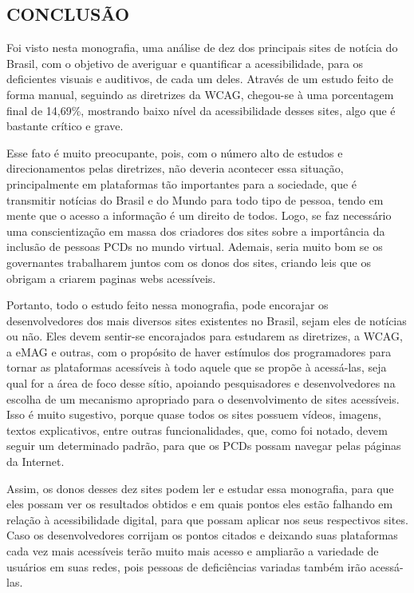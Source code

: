 \documentclass[a4paper]{article}
\begin{document}
\begin{titlepage}
\section{CONCLUSÃO}

Foi visto nesta monografia, uma análise de dez dos principais sites de notícia do Brasil, com o objetivo de averiguar e quantificar a acessibilidade, para os deficientes visuais e auditivos, de cada um deles. Através de um estudo feito de forma manual, seguindo as diretrizes da WCAG, chegou-se à uma porcentagem final de 14,69\%, mostrando baixo nível da acessibilidade desses sites, algo que é bastante crítico e grave. 

Esse fato é muito preocupante, pois, com o número alto de estudos e direcionamentos pelas diretrizes, não deveria acontecer essa situação, principalmente em plataformas tão importantes para a sociedade, que é transmitir notícias do Brasil e do Mundo para todo tipo de pessoa, tendo em mente que o acesso a informação é um direito de todos. Logo, se faz necessário uma conscientização em massa dos criadores dos sites sobre a importância da inclusão de pessoas PCDs no mundo virtual. Ademais, seria muito bom se os governantes trabalharem juntos com os donos dos sites, criando leis que os obrigam a criarem paginas webs acessíveis.

Portanto, todo o estudo feito nessa monografia, pode encorajar os desenvolvedores dos mais diversos sites existentes no Brasil, sejam eles de notícias ou não. Eles devem sentir-se encorajados para estudarem as diretrizes, a WCAG, a eMAG e outras, com o propósito de haver estímulos dos programadores para tornar as plataformas acessíveis à todo aquele que se propõe à acessá-las, seja qual for a área de foco desse sítio, apoiando pesquisadores e desenvolvedores na escolha de um mecanismo apropriado para o desenvolvimento de sites acessíveis. Isso é muito sugestivo, porque quase todos os sites possuem vídeos, imagens, textos explicativos, entre outras funcionalidades, que, como foi notado, devem seguir um determinado padrão, para que os PCDs possam navegar pelas páginas da Internet.

Assim, os donos desses dez sites podem ler e estudar essa monografia, para que eles possam ver os resultados obtidos e em quais pontos eles estão falhando em relação à acessibilidade digital, para que possam aplicar nos seus respectivos sites. Caso os desenvolvedores corrijam os pontos citados e deixando suas plataformas cada vez mais acessíveis terão muito mais acesso e ampliarão a variedade de usuários em suas redes, pois pessoas de deficiências variadas também irão acessá-las.


\end{titlepage}
\end{document}
